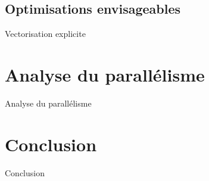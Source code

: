 \documentclass[9.5pt]{beamer}
\begin{document}
	\subsection{Optimisations envisageables}
		\begin{frame}{Vectorisation explicite}
		\end{frame}

\section{Analyse du parallélisme}
	\begin{frame}{Analyse du parallélisme}
	\end{frame}

\section{Conclusion}
	\begin{frame}{Conclusion}
	\end{frame}
\end{document}
